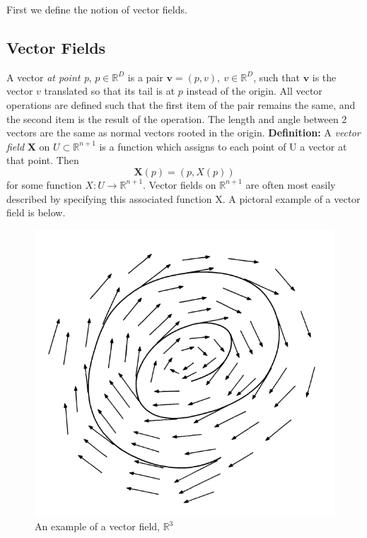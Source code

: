 \documentclass[12pt]{report}
\begin{document}
First we define the notion of vector fields.

\subsection{Vector Fields}
A vector \textit{at point p}, $p \in \mathbb{R}^{D}$ is a pair 
$\textbf{v} = (p, v), \ v \in \mathbb{R}^{D}$, such that $\mathbf{v}$ 
is the vector $v$ translated so that its tail is at $p$ instead of the origin. 
All vector operations are defined such that the first item of the pair remains the same, 
and the second item is the result of the operation. 
The length and angle between 2 vectors are the same as normal vectors rooted in the origin.
\textbf{Definition:} A \textit{vector field} \textbf{X} on 
$U \subset \mathbb{R}^{n+1}$ is a function which assigns to each point
of U a vector at that point. Then
$$\textbf{X}(p) = (p, X(p))$$ for some function 
$X: U \longrightarrow \mathbb{R}^{n+1}$. Vector fields on 
$\mathbb{R}^{n+1}$ are often most easily described by 
specifying this associated function X.
A pictoral example of a vector field is below.
\begin{figure}[h]
    \begin{center}
        \includegraphics[scale=0.5]{fig2.5.PNG}
        \caption{An example of a vector field, $\mathbb{R}^3$}
        \label{fig:Graph 4}
    \end{center}
\end{figure}
\end{document}
